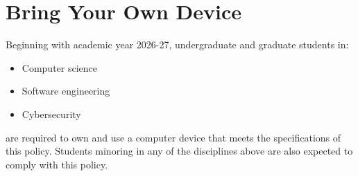 \section{Bring Your Own Device}

Beginning with academic year 2026-27, undergraduate and graduate students in:

\begin{itemize}
    \item Computer science
    \item Software engineering
    \item Cybersecurity
\end{itemize}
%
are required to own and use a computer device that meets the specifications of this policy.
Students minoring in any of the disciplines above are also expected to comply with this policy.